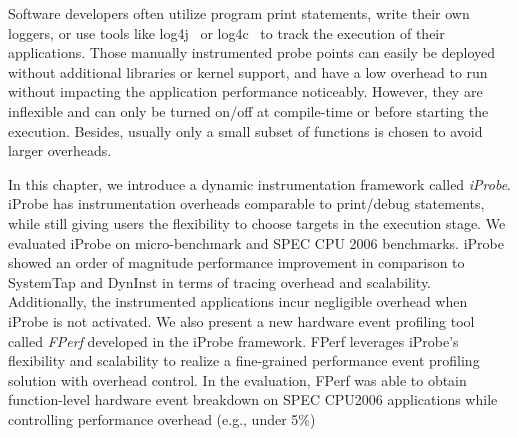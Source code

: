 Software developers often utilize program print statements, write their own loggers, or use tools like log4j~\cite{log4j} or log4c~\cite{log4c} to track the execution of their applications.
Those manually instrumented probe points can easily be deployed without additional libraries or kernel support, and have a low overhead to run 
without impacting the application performance noticeably. 
However, they are inflexible and can only be turned on/off at compile-time or before starting the execution. 
Besides, usually only a small subset of functions is chosen to avoid larger overheads.

In this chapter, we introduce a dynamic instrumentation framework called \emph{iProbe}.
iProbe has instrumentation overheads comparable to print/debug statements, while still giving users the flexibility to choose targets in the execution stage. 
We evaluated iProbe on micro-benchmark and SPEC CPU 2006 benchmarks.
iProbe showed an order of magnitude performance improvement in comparison to SystemTap\cite{utrace} and DynInst\cite{dyninst} in terms of tracing overhead and scalability.
Additionally, the instrumented applications incur negligible overhead when iProbe is not activated.
We also present a new hardware event profiling tool called \emph{FPerf} developed in the iProbe framework.  
FPerf leverages iProbe's flexibility and scalability to realize a fine-grained performance event profiling solution with overhead control.
In the evaluation, FPerf was able to obtain function-level hardware event breakdown on SPEC CPU2006 applications while controlling performance overhead (e.g., under 5\%)




